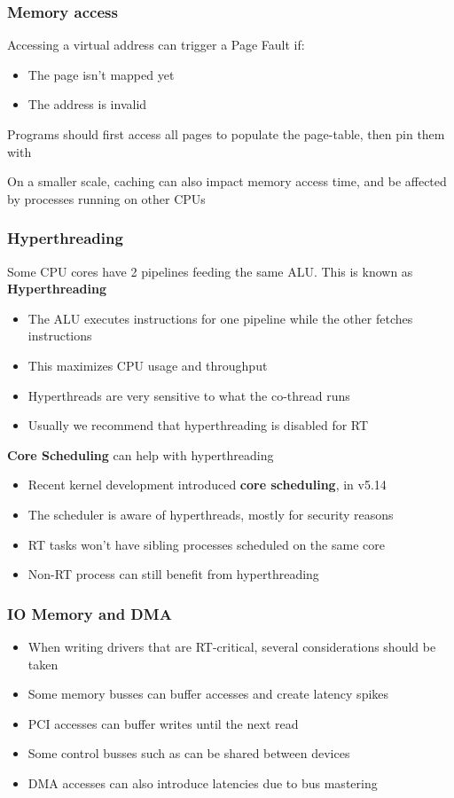 \begin{frame}
	\frametitle{Memory access}
	Accessing a virtual address can trigger a Page Fault if:
	\begin{itemize}
		\item The page isn't mapped yet
		\item The address is invalid
	\end{itemize}
	Programs should first access all pages to populate the page-table, then
	pin them with 

	On a smaller scale, caching can also impact memory access time, and be affected by
	processes running on other CPUs
\end{frame}

\begin{frame}
	\frametitle{Hyperthreading}
	Some CPU cores have 2 pipelines feeding the same ALU. This is known as \textbf{Hyperthreading}
	\begin{itemize}
		\item The ALU executes instructions for one pipeline while the other fetches instructions
		\item This maximizes CPU usage and throughput
		\item Hyperthreads are very sensitive to what the co-thread runs
		\item Usually we recommend that hyperthreading is disabled for RT
	\end{itemize}
	\textbf{Core Scheduling} can help with hyperthreading
	\begin{itemize}
		\item Recent kernel development introduced \textbf{core scheduling}, in v5.14
		\item The scheduler is aware of hyperthreads, mostly for security reasons
		\item RT tasks won't have sibling processes scheduled on the same core
		\item Non-RT process can still benefit from hyperthreading
	\end{itemize}
\end{frame}

\begin{frame}
	\frametitle{IO Memory and DMA}
	\begin{itemize}
		\item When writing drivers that are RT-critical, several considerations should be taken
		\item Some memory busses can buffer accesses and create latency spikes
		\item PCI accesses can buffer writes until the next read
		\item Some control busses such as  can be shared between devices
		\item DMA accesses can also introduce latencies due to bus mastering
	\end{itemize}
\end{frame}

